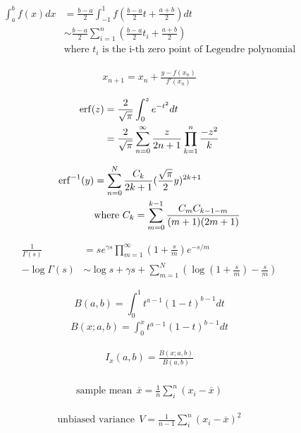 \begin{align*} 
    \int_a^bf(x)dx &= \frac{b-a}{2}\int_{-1}^1f\left(\frac{b-a}{2}t+\frac{a+b}{2}\right)dt\\
    &\sim \frac{b-a}{2}\sum_{i=1}^{n}\left(\frac{b-a}{2}t_i+\frac{a+b}{2}\right)\\
    &\text{where $t_i$ is the i-th zero point of Legendre polynomial}
\end{align*}

\begin{align*} 
    x_{n+1} = x_n + \frac{y-f(x_n)}{f'(x_n)}
\end{align*}

\begin{align*} 
    {\rm erf}(z) &= \frac{2}{\sqrt{\pi}}\int_{0}^{z}e^{-t^2}dt \\
    &= \frac{2}{\sqrt{\pi}}\sum_{n=0}^{\infty}\frac{z}{2n+1}\prod_{k=1}^{n}\frac{-z^2}{k}
\end{align*}

\begin{align*} 
    {\rm erf}^{-1}(y) &= \sum_{n=0}^{N}\frac{C_k}{2k+1}(\frac{\sqrt{\pi}}{2}y)^{2k+1} \\
    &\text{where}~C_k = \sum_{m=0}^{k-1}\frac{C_mC_{k-1-m}}{(m+1)(2m+1)}
\end{align*}

\begin{align*} 
    \frac{1}{\Gamma(s)} &= se^{\gamma s}\prod_{m=1}^{\infty}(1+\frac{s}{m})e^{-s/m} \\
    -\log\Gamma(s) &\sim \log s+\gamma s + \sum_{m=1}^{N}\left(\log(1+\frac{s}{m})-\frac{s}{m}\right)
\end{align*}

\[ B(a,b) = \int_0^1 t^{a-1}(1-t)^{b-1}dt \]
\begin{align*}
    B(x;a,b) = \int_0^x t^{a-1}(1-t)^{b-1}dt
\end{align*}

\begin{align*}
    I_x(a,b) = \frac{B(x;a,b)}{B(a,b)} \\
\end{align*}

\begin{align*} 
    \text{sample mean}~~\overline{x} = \frac{1}{n}\sum_i^{n}(x_i-\overline{x})
\end{align*}

\begin{align*} 
    \text{unbiased variance}~~V = \frac{1}{n-1}\sum_i^{n}(x_i-\overline{x})^2
\end{align*}

